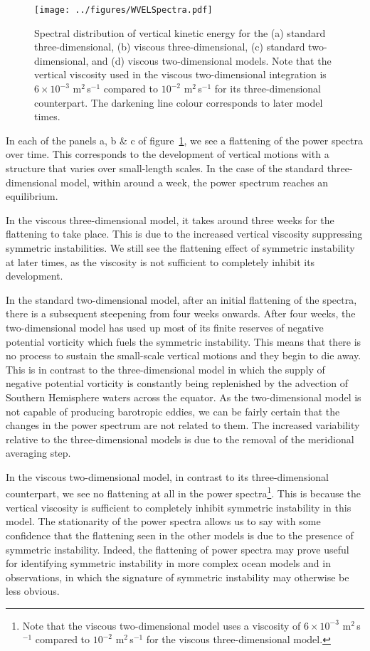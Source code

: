 \begin{figure} 
    \centering
    \texttt{[image: ../figures/WVELSpectra.pdf]}
    \caption{Spectral distribution of vertical kinetic energy for the (a) standard three-dimensional, (b) viscous three-dimensional, (c) standard two-dimensional, and (d) viscous two-dimensional models. Note that the vertical viscosity used in the viscous two-dimensional integration is $6 \times 10^{-3}$ m$^2\,$s$^{-1}$ compared to $10^{-2}$ m$^2\,$s$^{-1}$ for its three-dimensional counterpart. The darkening line colour corresponds to later model times.}
    \label{fig:SpectralEnergyDensity}
\end{figure}

In each of the panels a, b \& c of figure~\ref{fig:SpectralEnergyDensity}, we see a flattening of the power spectra over time. This corresponds to the development of vertical motions with a structure that varies over small-length scales. In the case of the standard three-dimensional model, within around a week, the power spectrum reaches an equilibrium.

In the viscous three-dimensional model, it takes around three weeks for the flattening to take place. This is due to the increased vertical viscosity suppressing symmetric instabilities. We still see the flattening effect of symmetric instability at later times, as the viscosity is not sufficient to completely inhibit its development.

In the standard two-dimensional model, after an initial flattening of the spectra, there is a subsequent steepening from four weeks onwards. After four weeks, the two-dimensional model has used up most of its finite reserves of negative potential vorticity which fuels the symmetric instability. This means that there is no process to sustain the small-scale vertical motions and they begin to die away. This is in contrast to the three-dimensional model in which the supply of negative potential vorticity is constantly being replenished by the advection of Southern Hemisphere waters across the equator. As the two-dimensional model is not capable of producing barotropic eddies, we can be fairly certain that the changes in the power spectrum are not related to them. The increased variability relative to the three-dimensional models is due to the removal of the meridional averaging step.

In the viscous two-dimensional model, in contrast to its three-dimensional counterpart, we see no flattening at all in the power spectra\footnote{Note that the viscous two-dimensional model uses a viscosity of $6 \times 10^{-3}$ m$^2$\,s$^{-1}$ compared to $10^{-2}$ m$^2$\,s$^{-1}$ for the viscous three-dimensional model.}. This is because the vertical viscosity is sufficient to completely inhibit symmetric instability in this model. The stationarity of the power spectra allows us to say with some confidence that the flattening seen in the other models is due to the presence of symmetric instability. Indeed, the flattening of power spectra may prove useful for identifying symmetric instability in more complex ocean models and in observations, in which the signature of symmetric instability may otherwise be less obvious.

